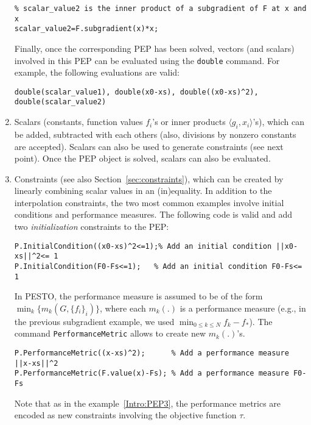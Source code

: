 \documentclass[11pt,a4paper]{article}
\newcommand{\inner}[2]{{\langle #1, #2\rangle}}
\begin{document}
\begin{enumerate}
\begin{lstlisting}
% scalar_value2 is the inner product of a subgradient of F at x and x
scalar_value2=F.subgradient(x)*x; 
\end{lstlisting}
Finally, once the corresponding PEP has been solved, vectors (and scalars) involved in this PEP can be evaluated using the \verb?double? command. For example, the following evaluations are valid:\\[-1cm]
\begin{lstlisting}
double(scalar_value1), double(x0-xs), double((x0-xs)^2), double(scalar_value2)
\end{lstlisting}
\item Scalars (constants, function values $f_i$'s or inner products $\inner{g_i}{x_i}$'s), which can be added, subtracted with each others (also, divisions by nonzero constants are accepted). Scalars can also be used to generate constraints (see next point). Once the PEP object is solved, scalars can also be evaluated.
\item Constraints (see also Section~\ref{sec:constraints}), which can be created by linearly combining scalar values in an (in)equality. In addition to the interpolation constraints, the two most common examples involve initial conditions and performance measures. The following code is valid and add two \emph{initialization} constraints to the PEP:\\[-1cm]
\begin{lstlisting}
P.InitialCondition((x0-xs)^2<=1);% Add an initial condition ||x0-xs||^2<= 1
P.InitialCondition(F0-Fs<=1);	% Add an initial condition F0-Fs<= 1
\end{lstlisting}
In PESTO, the performance measure is assumed to be of the form $\min_k \{m_k(G,\{f_i\}_i)\}$, where each $m_k(.)$ is a performance measure (e.g., in the previous subgradient example, we used $\min_{0\leq k \leq N} f_k-f_*$). The command \verb?PerformanceMetric? allows to create new $m_k(.)$'s.\\[-1cm]
\begin{lstlisting}
P.PerformanceMetric((x-xs)^2); 		% Add a performance measure ||x-xs||^2
P.PerformanceMetric(F.value(x)-Fs);	% Add a performance measure F0-Fs
\end{lstlisting}
Note that as in the example~\eqref{Intro:PEP3}, the performance metrics are encoded as new constraints involving the objective function $\tau$. 
\end{enumerate}
\newpage
\end{document}
